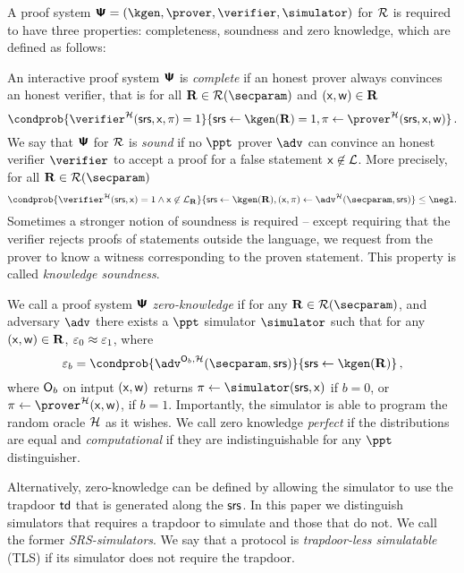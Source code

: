 A proof system $\proofsystem = (\kgen, \prover, \verifier, \simulator)$ for $\mathcal{R}$ is
required to have three properties: completeness, soundness and zero knowledge, which are
defined as follows:

  An interactive proof system $\bm{\mathsf{\Psi}}$ is
  \emph{complete} if an honest prover always convinces an honest verifier, that
  is for all $\REL \in \RELGEN(\secparam)$ and $(\mathsf{x}, \mathsf{w}) \in \mathbf{R}$
	\[
		\condprob{\verifier^\ro (\srs, \inp, \zkproof) = 1} {\srs \gets \kgen(\REL) = 1, \zkproof \gets \prover^\ro (\srs, \inp, \wit)}\,.
	\]
    We say that $\bm{\mathsf{\Psi}}$ for $\mathcal{R}$ is \emph{sound} if no
  $\ppt$ prover $\adv$ can convince an honest verifier $\verifier$ to accept a
  proof for a false statement $\mathsf{x} \not\in\mathcal{L}$. More precisely, for
  all $\REL \in \RELGEN(\secparam)$
	\[
    \condprob{ \verifier^\ro (\srs, \inp) = 1 \land \inp \not\in \LANG_\REL}{\srs \gets \kgen(\REL), (\inp, \zkproof) \gets \adv^\ro(\secparam, \srs)} \leq
    \negl.
	\]
Sometimes a stronger notion of soundness is required -- except requiring that the
verifier rejects proofs of statements outside the language, we request from the
prover to know a witness corresponding to the proven statement. This property is
called \emph{knowledge soundness}.%
 
  We call a proof system $\bm{\mathsf{\Psi}}$
\emph{zero-knowledge} if for any $\REL \in \RELGEN(\secparam)$, and adversary
$\adv$ there exists a $\ppt$ simulator $\simulator$ such that for any
$(\mathsf{x}, \mathsf{w}) \in \mathbf{R}$, $\varepsilon_0 \approx \varepsilon_1$, where
\[
  \eps_b = \condprob{\adv^{\oracleo_b, \ro} (\secparam, \srs)}{\srs \gets \kgen (\REL)}\,,
\]
where $\mathsf{O}_b$ on intput $(\mathsf{x}, \mathsf{w})$ returns $\zkproof \gets \simulator (\srs, \inp)$ if $b = 0$, or $\zkproof \gets \prover^\ro (\inp, \wit)$, if $b = 1$. Importantly, the simulator is able to program the random oracle $\mathcal{H}$ as it wishes.
We call zero knowledge \emph{perfect} if the distributions are equal and
\emph{computational} if they are indistinguishable for any $\ppt$ distinguisher.

Alternatively, zero-knowledge can be defined by allowing the simulator to use
the trapdoor $\mathsf{td}$ that is generated along the $\mathsf{srs}$. In this paper we distinguish
simulators that requires a trapdoor to simulate and those that do not. We call
the former \emph{SRS-simulators}. We say that a protocol is \emph{trapdoor-less simulatable} (TLS) if its simulator does not require the trapdoor.

